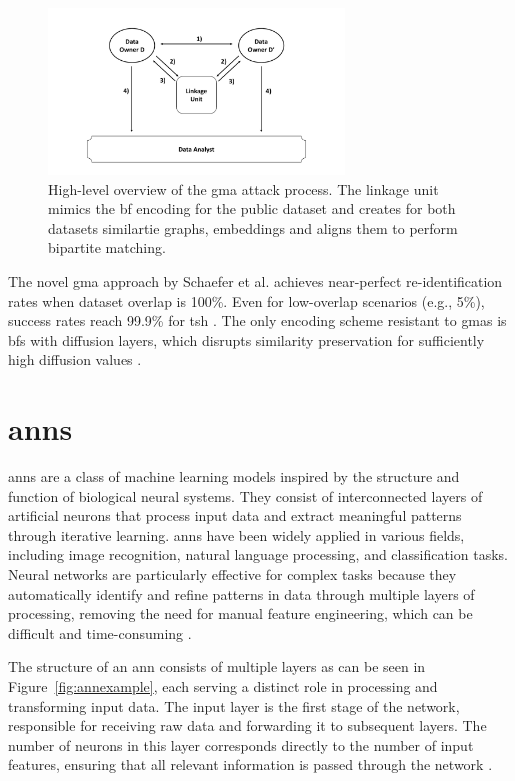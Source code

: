 \begin{figure}[H]
  \centering
  \includegraphics[width=0.7\textwidth, page=10]{img/visualization.pdf}
  \caption{High-level overview of the \ac{gma} attack process.
  The linkage unit mimics the \ac{bf} encoding for the public dataset and creates for both datasets similartie graphs, embeddings and aligns them to perform bipartite matching.}
  \label{fig:gmaexampletwo}
\end{figure}

The novel \ac{gma} approach by Schaefer et al. \cite{schaefer2024} achieves near-perfect re-identification rates when dataset overlap is 100\%.
Even for low-overlap scenarios (e.g., 5\%), success rates reach 99.9\% for \ac{tsh} \cite{schaefer2024}.
The only encoding scheme resistant to \ac{gma}s is \ac{bf}s with diffusion layers, which disrupts similarity preservation for sufficiently high diffusion values \cite{schaefer2024}.


\section{\ac{ann}s} \label{sec:nn}

\ac{ann}s are a class of machine learning models inspired by the structure and function of biological neural systems.
They consist of interconnected layers of artificial neurons that process input data and extract meaningful patterns through iterative learning.
\ac{ann}s have been widely applied in various fields, including image recognition, natural language processing, and classification tasks.
Neural networks are particularly effective for complex tasks because they automatically identify and refine patterns in data through multiple layers of processing, removing the need for manual feature engineering, which can be difficult and time-consuming \cite{dongare2012introduction}.

The structure of an \ac{ann} consists of multiple layers as can be seen in Figure~\ref{fig:annexample}, each serving a distinct role in processing and transforming input data.
The input layer is the first stage of the network, responsible for receiving raw data and forwarding it to subsequent layers.
The number of neurons in this layer corresponds directly to the number of input features, ensuring that all relevant information is passed through the network \cite{dongare2012introduction}.

